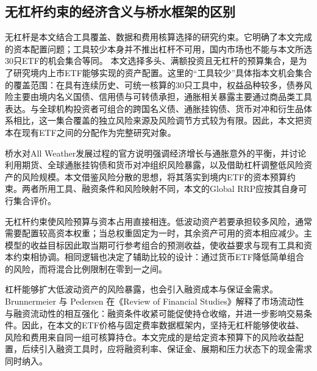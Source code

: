 \subsection{无杠杆约束的经济含义与桥水框架的区别}
\label{sec:unlevered}
无杠杆是本文结合工具覆盖、数据和费用核算选择的研究约束。它明确了本文完成的资本配置问题；工具较少本身并不推出杠杆不可用，国内市场也不能与本文所选30只ETF的机会集合等同。
本文选择多头、满额投资且无杠杆的预算集合，是为了研究境内上市ETF能够实现的资产配置。这里的“工具较少”具体指本文机会集合的覆盖范围：在具有连续历史、可统一核算的30只工具中，权益品种较多，债券风险主要由境内名义国债、信用债与可转债承担，通胀相关暴露主要通过商品类工具表达。与全球机构投资者可组合的跨国名义债、通胀挂钩债、货币对冲和衍生品体系相比，这一集合覆盖的独立风险来源及风险调节方式较为有限。因此，本文把资本在现有ETF之间的分配作为完整研究对象。

桥水对All Weather发展过程的官方说明强调经济增长与通胀意外的平衡，并讨论利用期货、全球通胀挂钩债和货币对冲组织风险暴露，以及借助杠杆调整低风险资产的风险规模\cite{bridgewater2012allweather}。本文借鉴风险分散的思想，将其落实到境内ETF的资本预算约束。两者所用工具、融资条件和风险映射不同，本文的Global RRP应按其自身可行集合评价。

无杠杆约束使风险预算与资本占用直接相连。低波动资产若要承担较多风险，通常需要配置较高资本权重；当总权重固定为一时，其余资产可用的资本相应减少。主模型的收益目标因此取当期可行参考组合的预测收益，使收益要求与现有工具和资本约束相协调。相同逻辑也决定了辅助比较的设计：通过货币ETF降低简单组合的风险，而将混合比例限制在零到一之间。

杠杆能够扩大低波动资产的风险暴露，也会引入融资成本与保证金需求。Brunnermeier 与 Pedersen 在《Review of Financial Studies》解释了市场流动性与融资流动性的相互强化：融资条件收紧可能促使持仓收缩，并进一步影响交易条件\cite{brunnermeier2009liquidity}。因此，在本文的ETF价格与固定费率数据框架内，坚持无杠杆能够使收益、风险和费用来自同一组可核算持仓。本文完成的是给定资本预算下的风险收益配置，后续引入融资工具时，应将融资利率、保证金、展期和压力状态下的现金需求同时纳入。
